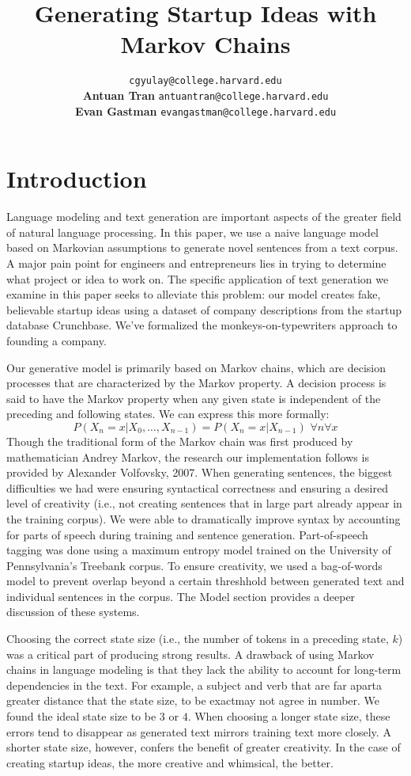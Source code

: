 \documentclass[11pt]{article}
\title{Generating Startup Ideas with Markov Chains}
\author{
  \noindent\makebox[0.57\textwidth][l]{\textbf{Colton Gyulay}} \hfill
  \texttt{cgyulay@college.harvard.edu}\\
  \textbf{Antuan Tran} \hfill
  \texttt{antuantran@college.harvard.edu}\\
  \textbf{Evan Gastman} \hfill
  \texttt{evangastman@college.harvard.edu}
}
\begin{document}
\maketitle{}

\section{Introduction}

Language modeling and text generation are important aspects of the greater
field of natural language processing. In this paper, we use a naive language
model based on Markovian assumptions to generate novel sentences from a text
corpus. A major pain point for engineers and entrepreneurs lies in trying to
determine what project or idea to work on. The specific application of text
generation we examine in this paper seeks to alleviate this problem: our model creates fake, believable startup ideas using a dataset of company descriptions from the startup database Crunchbase. We've formalized the monkeys-on-typewriters approach to founding a company.

Our generative model is primarily based on Markov chains, which are decision
processes that are characterized by the Markov property. A decision process is said to have the Markov property when any given state is independent of the preceding and following states. We can express this more formally:
\[P(X_n = x|X_0,\dots,X_{n-1}) =P(X_n = x|X_{n-1})\,\,\forall{n}\forall{x}\]
Though the traditional form of the Markov chain was first produced by mathematician Andrey Markov, the research our implementation follows is
provided by Alexander Volfovsky, 2007.\cite{volfovsky2007} When generating sentences, the biggest difficulties we had were ensuring syntactical correctness and ensuring a desired level of creativity (i.e., not creating sentences that in large part already appear in the training corpus). We were able to dramatically improve syntax by accounting for parts of speech during training and sentence generation. Part-of-speech tagging was done using a maximum entropy model
trained on the University of Pennsylvania's Treebank corpus.\cite{ratnaparkhi1996} To ensure creativity, we used a bag-of-words model to prevent overlap beyond a certain threshhold between generated text and individual sentences in the corpus. The Model section provides a deeper discussion of these systems.

Choosing the correct state size (i.e., the number of tokens in a preceding state, \(k\)) was a critical part of producing strong results. A drawback of using Markov chains in language modeling is that they lack the ability to account for long-term dependencies in the text. For example, a subject and verb that are far apart\textemdash a greater distance that the state size, to be exact\textemdash may not agree in number. We found the ideal state size to be \(3\) or \(4\). When choosing a longer state size, these errors tend to disappear as generated text mirrors training text more closely. A shorter state size, however, confers the benefit of greater creativity. In the case of creating startup ideas, the more creative and whimsical, the better.
\end{document}
